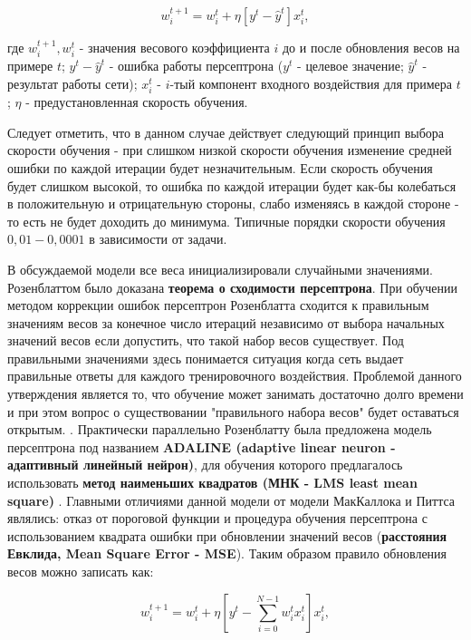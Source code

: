 \documentclass[12pt]{article}
\begin{document}
\begin{sloppypar}
\begin{equation}
	w^{t+1}_i = w^{t}_i+\eta [y^t-\hat{y}^t]x^t_i, 
\end{equation}

где $w^{t+1}_i, w^{t}_i$ - значения весового коэффициента $i$ до и после обновления весов на примере $t$; $y^t-\hat{y}^t$ - ошибка работы персептрона ($y^t$ - целевое значение; $\hat{y}^t$ - результат работы сети); $x^t_i$ - $i$-тый компонент входного воздействия для примера $t$; $\eta$ - предустановленная скорость обучения.

Следует отметить, что в данном случае действует следующий принцип выбора скорости обучения - при слишком низкой скорости обучения изменение средней ошибки по каждой итерации будет незначительным. Если скорость обучения будет слишком высокой, то ошибка по каждой итерации будет как-бы колебаться в положительную и отрицательную стороны, слабо изменяясь в каждой стороне - то есть не будет доходить до минимума. Типичные порядки скорости обучения $0,01 - 0,0001$ в зависимости от задачи. 

В обсуждаемой модели все веса инициализировали случайными значениями. Розенблаттом было доказана \textbf{теорема о сходимости персептрона}. При обучении методом коррекции ошибок персептрон Розенблатта сходится к правильным значениям весов за конечное число итераций независимо от выбора начальных значений весов если допустить, что такой набор весов существует. Под правильными значениями здесь понимается ситуация когда сеть выдает правильные ответы для каждого тренировочного воздействия. Проблемой данного утверждения является то, что обучение может занимать достаточно долго времени и при этом вопрос о существовании "правильного набора весов" будет оставаться открытым. \cite{kelleher2019deep}. 
Практически параллельно Розенблатту была предложена модель персептрона под названием 
\textbf{ADALINE (adaptive linear neuron - адаптивный линейный нейрон)}, 
для обучения которого предлагалось использовать \textbf{метод наименьших квадратов 
(МНК - LMS least mean square)} 
\cite{widrow1960adaptive}. 
Главными отличиями данной модели от модели МакКаллока и Питтса являлись: 
отказ от пороговой функции и процедура обучения персептрона с использованием квадрата ошибки при обновлении значений весов (\textbf{расстояния Евклида, Mean Square Error - MSE}).
Таким образом правило обновления весов можно записать как:

\begin{equation}
	\label{ch1:eqn:ADALINE}
	w^{t+1}_i = w^{t}_i+\eta [y^t-\sum_{i=0}^{N-1}w^{t}_ix^t_i]x^t_i, 
\end{equation}


\end{sloppypar}
\end{document}
